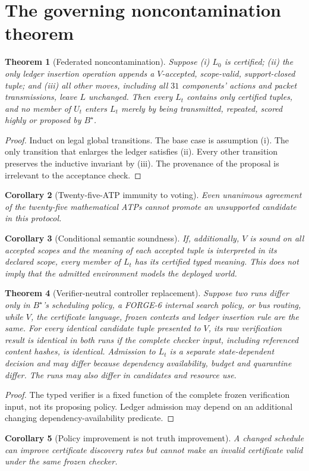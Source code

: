 \documentclass[11pt,letterpaper,oneside]{book}
\newtheorem{theorem}{Theorem}[chapter]
\newtheorem{corollary}[theorem]{Corollary}
\theoremstyle{definition}
\theoremstyle{remark}
\begin{document}
\section{The governing noncontamination theorem}
\begin{theorem}[Federated noncontamination]\label{thm:noncontam}
Suppose (i) $L_0$ is certified; (ii) the only ledger insertion operation
appends a $V$-accepted, scope-valid, support-closed tuple; and (iii)
all other moves, including all $31$ components' actions and packet
transmissions, leave $L$ unchanged. Then every $L_t$ contains only
certified tuples, and no member of $U_t$ enters $L_t$ merely by being
transmitted, repeated, scored highly or proposed by $B^\star$.
\end{theorem}
\begin{proof}
Induct on legal global transitions. The base case is assumption (i).
The only transition that enlarges the ledger satisfies (ii). Every other
transition preserves the inductive invariant by (iii). The provenance
of the proposal is irrelevant to the acceptance check.\end{proof}
\begin{corollary}[Twenty-five-ATP immunity to voting]
Even unanimous agreement of the twenty-five mathematical ATPs cannot
promote an unsupported candidate in this protocol.\end{corollary}
\begin{corollary}[Conditional semantic soundness]
If, additionally, $V$ is sound on all accepted scopes and the meaning of
each accepted tuple is interpreted in its declared scope, every member
of $L_t$ has its certified typed meaning. This does \emph{not} imply
that the admitted environment models the deployed world.
\end{corollary}

\begin{theorem}[Verifier-neutral controller replacement]\label{thm:neutral}
Suppose two runs differ only in $B^\star$'s scheduling policy, a
FORGE-6 internal search policy, or bus routing, while $V$, the
certificate language, frozen contexts and ledger insertion rule are
the same. For every \emph{identical candidate tuple} presented to $V$,
its raw verification result is identical in both runs if the complete
checker input, including referenced content hashes, is identical.
Admission to $L_t$ is a separate state-dependent decision and may
differ because dependency availability, budget and quarantine differ.
The runs may also differ in candidates and resource use.
\end{theorem}
\begin{proof}The typed verifier is a fixed function of the complete
frozen verification input, not its proposing policy. Ledger admission
may depend on an additional changing dependency-availability predicate.\end{proof}
\begin{corollary}[Policy improvement is not truth improvement]
A changed schedule can improve certificate discovery rates but cannot
make an invalid certificate valid under the same frozen checker.
\end{corollary}
\end{document}
